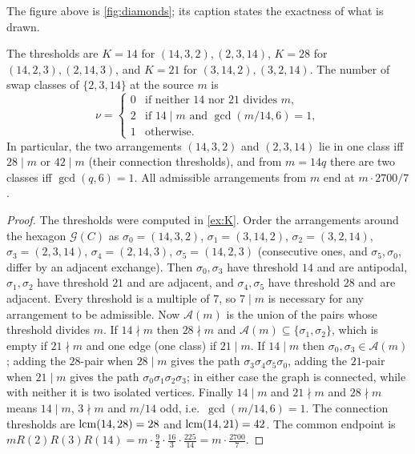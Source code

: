 \noindent The figure above is \cref{fig:diamonds}; its caption states the exactness of what is drawn.
\begin{theorem}\label{thm:2314}
The thresholds are $K=14$ for $(14,3,2),(2,3,14)$, $K=28$ for $(14,2,3),(2,14,3)$, and $K=21$ for $(3,14,2),(3,2,14)$. The number of swap classes of $\{2,3,14\}$ at the source $m$ is
\[
 \nu=\begin{cases}0&\text{if neither }14\text{ nor }21\text{ divides }m,\\ 2&\text{if }14\mid m\text{ and }\gcd(m/14,6)=1,\\ 1&\text{otherwise.}\end{cases}
\]
In particular, the two arrangements $(14,3,2)$ and $(2,3,14)$ lie in one class iff $28\mid m$ or $42\mid m$ (their connection thresholds), and from $m=14q$ there are two classes iff $\gcd(q,6)=1$. All admissible arrangements from $m$ end at $m\cdot2700/7$.
\end{theorem}
\begin{proof}
The thresholds were computed in \cref{ex:K}. Order the arrangements around the hexagon $\mathcal G(C)$ as $\sigma_0=(14,3,2)$, $\sigma_1=(3,14,2)$, $\sigma_2=(3,2,14)$, $\sigma_3=(2,3,14)$, $\sigma_4=(2,14,3)$, $\sigma_5=(14,2,3)$ (consecutive ones, and $\sigma_5,\sigma_0$, differ by an adjacent exchange). Then $\sigma_0,\sigma_3$ have threshold $14$ and are antipodal, $\sigma_1,\sigma_2$ have threshold $21$ and are adjacent, and $\sigma_4,\sigma_5$ have threshold $28$ and are adjacent. Every threshold is a multiple of $7$, so $7\mid m$ is necessary for any arrangement to be admissible. Now $\mathcal A(m)$ is the union of the pairs whose threshold divides $m$. If $14\nmid m$ then $28\nmid m$ and $\mathcal A(m)\subseteq\{\sigma_1,\sigma_2\}$, which is empty if $21\nmid m$ and one edge (one class) if $21\mid m$. If $14\mid m$ then $\sigma_0,\sigma_3\in\mathcal A(m)$; adding the $28$-pair when $28\mid m$ gives the path $\sigma_3\sigma_4\sigma_5\sigma_0$, adding the $21$-pair when $21\mid m$ gives the path $\sigma_0\sigma_1\sigma_2\sigma_3$; in either case the graph is connected, while with neither it is two isolated vertices. Finally $14\mid m$ and $21\nmid m$ and $28\nmid m$ means $14\mid m$, $3\nmid m$ and $m/14$ odd, i.e.\ $\gcd(m/14,6)=1$. The connection thresholds are $\operatorname{lcm}(14,28)=28$ and $\operatorname{lcm}(14,21)=42$. The common endpoint is $mR(2)R(3)R(14)=m\cdot\frac92\cdot\frac{16}3\cdot\frac{225}{14}=m\cdot\frac{2700}7$.
\end{proof}
